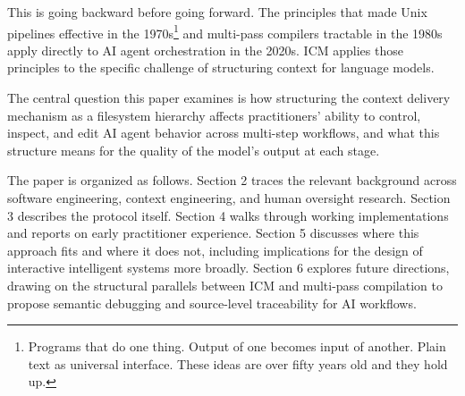 \documentclass[acmlarge,nonacm,screen]{acmart}
\begin{document}
This is going backward before going forward. The principles that made Unix pipelines effective in the 1970s\footnote{Programs that do one thing. Output of one becomes input of another. Plain text as universal interface. These ideas are over fifty years old and they hold up.} and multi-pass compilers tractable in the 1980s apply directly to AI agent orchestration in the 2020s. ICM applies those principles to the specific challenge of structuring context for language models.

The central question this paper examines is how structuring the context delivery mechanism as a filesystem hierarchy affects practitioners' ability to control, inspect, and edit AI agent behavior across multi-step workflows, and what this structure means for the quality of the model's output at each stage.

The paper is organized as follows. Section 2 traces the relevant background across software engineering, context engineering, and human oversight research. Section 3 describes the protocol itself. Section 4 walks through working implementations and reports on early practitioner experience. Section 5 discusses where this approach fits and where it does not, including implications for the design of interactive intelligent systems more broadly. Section 6 explores future directions, drawing on the structural parallels between ICM and multi-pass compilation to propose semantic debugging and source-level traceability for AI workflows.
\end{document}
